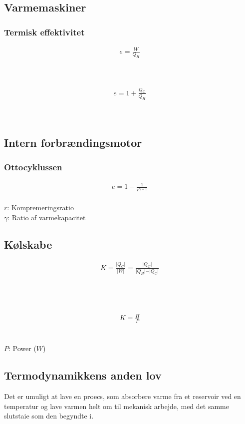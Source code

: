 \subsection{Varmemaskiner}
	\subsubsection{Termisk effektivitet}
		\begin{align}
			e=\frac{W}{Q_H}
		\end{align}
		\effektivitet\\
		\arbejde\\
		\varmeV

		\begin{align}
			e=1+\frac{Q_C}{Q_H}
		\end{align}
		\effektivitet\\
		\varmeK\\
		\varmeV

\subsection{Intern forbrændingsmotor}
	\subsubsection{Ottocyklussen}
		\begin{align}
			e=1-\frac{1}{r^{\gamma-1}}
		\end{align}
		\effektivitet\\
		$r$: Kompremeringsratio\\
		$\gamma$: Ratio af varmekapacitet

\subsection{Kølskabe}
	\begin{align}
		K=\frac{\vert Q_C\vert}{\vert W\vert}=\frac{\vert Q_C\vert}{\vert Q_H\vert-\vert Q_C\vert}
	\end{align}
	\kolydkoef\\
	\varmeK\\
	\arbejde\\
	\varmeV

	\begin{align}
		K=\frac{H}{P}
	\end{align}
	\kolydkoef\\
	\varmehast\\
	$P$: Power ($W$)

\subsection{Termodynamikkens anden lov}
	Det er umuligt at lave en proecs, som absorbere varme fra et reservoir ved en temperatur og lave varmen helt om til mekanisk arbejde, med det samme slutstaie som den begyndte i.

